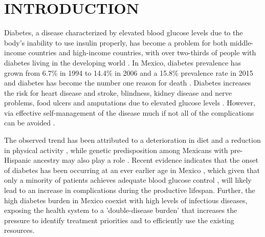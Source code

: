 \documentclass[12pt,english]{article}
\begin{document}
\section{\label{sec:Introduction4}INTRODUCTION }

Diabetes, a disease characterized by elevated blood glucose levels due to the body's inability to use insulin properly, has become a problem for both middle-income countries and high-income countries, with over two-thirds of people with diabetes living in the developing world \parencite{InternationalDiabetesFederation2015}. In Mexico, diabetes prevalence has grown from 6.7\% in 1994 to 14.4\% in 2006 \parencite{Barquera2013} and a 15.8\% prevalence rate in 2015 and diabetes has become the number one reason for death \parencite{InternationalDiabetesFederation2015}. Diabetes increases the risk for heart disease and stroke, blindness, kidney disease and nerve problems, food ulcers and amputations due to elevated glucose levels \parencite{Reynoso-Noveron2011}. However, via effective self-management of the disease much if not all of the complications can be avoided \parencite{Lim2011, Gregg2012}.

The observed trend has been attributed to a deterioration in diet and a reduction in physical activity \parencite{Barquera2008b,Basu2013}, while genetic predisposition among Mexicans with pre-Hispanic ancestry may also play a role \parencite{Williams2013}. Recent evidence indicates that the onset of diabetes has been occurring at an ever earlier age in Mexico \parencite{Bello-Chavolla2017a}, which given that only a minority of patients achieves adequate blood glucose control \parencite{Barquera2013}, will likely lead to an increase in complications during the productive lifespan. Further, the high diabetes burden in Mexico coexist with high levels of infectious diseases, exposing the health system to a 'double-disease burden' that increases the pressure to identify treatment priorities and to efficiently use the existing resources.
\end{document}
